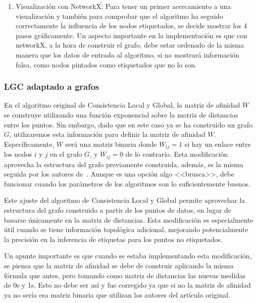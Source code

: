 \begin{enumerate}
	\item Visualización con NetworkX: Para tener un primer acercamiento a una visualización y también para comprobar que el algoritmo ha seguido correctamente la influencia de los nodos etiquetados, se decide mostrar los 4 pasos gráficamente. Un aspecto importante en la implementación es que con networkX, a la hora de construir el grafo, debe estar ordenado de la misma manera que los datos de entrada al algoritmo, si no mostrará información falsa, como nodos pintados como etiquetados que no lo son.
\end{enumerate}
\subsubsection{LGC adaptado a grafos}\label{sec5:LGC}
En el algoritmo original de Consistencia Local y Global, la matriz de afinidad $W$ se construye utilizando una función exponencial sobre la matriz de distancias entre los puntos. Sin embargo, dado que en este caso ya se ha construido un grafo $G$, utilizaremos esta información para definir la matriz de afinidad $W$. Específicamente, $W$ será una matriz binaria donde $W_{ij}=1$ si hay un enlace entre los nodos $i$ y $j$ en el grafo $G$, y $W_{ij}=0$ de lo contrario. Esta modificación aprovecha la estructura del grafo previamente construida, además, es la misma seguida por los autores de~\cite{gbili}. Aunque es una opción algo <<brusca>>, debe funcionar cuando los parámetros de los algoritmos son lo suficientemente buenos.

Este ajuste del algoritmo de Consistencia Local y Global permite aprovechar la estructura del grafo construido a partir de los puntos de datos, en lugar de basarse únicamente en la matriz de distancias. Esta modificación es especialmente útil cuando se tiene información topológica adicional, mejorando potencialmente la precisión en la inferencia de etiquetas para los puntos no etiquetados.

Un apunte importante es que cuando se estaba implementando esta modificación, se piensa que la matriz de afinidad se debe de construir aplicando la misma fórmula que antes, pero tomando como matriz de distancias las nuevas medidas de 0s y 1s. Esto no debe ser así y fue corregido ya que si no la matriz de afinidad ya no sería esa matriz binaria que utilizan los autores del artículo original.

